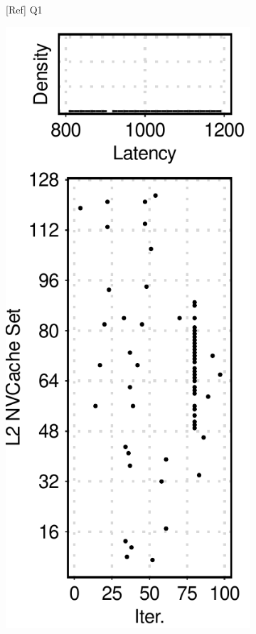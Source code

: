 \begin{figure}[t]
\begin{subfigure}[b]{.12\textwidth}
        \caption{[Ref] Q1}
        \label{fig:12:ref:side-channel-feature-q1}
    \end{subfigure}
    \hfill
    \begin{subfigure}[b]{.12\textwidth}
        \centering
        \includegraphics[width=\linewidth]{figure/plot/reference/fig12-side-sql-i1.pdf}

\end{subfigure}
\end{figure}
